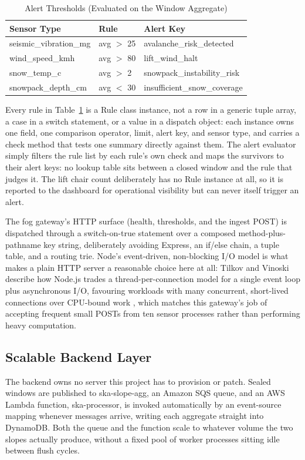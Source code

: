 \documentclass[conference]{IEEEtran}
\begin{document}
\begin{table}[!t]
\caption{Alert Thresholds (Evaluated on the Window Aggregate)}
\label{tab:thresholds}
\centering
\scriptsize
\setlength{\tabcolsep}{3pt}
\begin{tabular}{|l|l|l|}
\hline
\textbf{Sensor Type} & \textbf{Rule} & \textbf{Alert Key} \\
\hline
seismic\_vibration\_mg & avg $>$ 25 & avalanche\_risk\_detected \\
\hline
wind\_speed\_kmh & avg $>$ 80 & lift\_wind\_halt \\
\hline
snow\_temp\_c & avg $>$ 2 & snowpack\_instability\_risk \\
\hline
snowpack\_depth\_cm & avg $<$ 30 & insufficient\_snow\_coverage \\
\hline
\end{tabular}
\end{table}

Every rule in Table~\ref{tab:thresholds} is a Rule class instance, not a row in a generic tuple array, a case in a switch statement, or a value in a dispatch object: each instance owns one field, one comparison operator, limit, alert key, and sensor type, and carries a check method that tests one summary directly against them. The alert evaluator simply filters the rule list by each rule's own check and maps the survivors to their alert keys: no lookup table sits between a closed window and the rule that judges it. The lift chair count deliberately has no Rule instance at all, so it is reported to the dashboard for operational visibility but can never itself trigger an alert.

The fog gateway's HTTP surface (health, thresholds, and the ingest POST) is dispatched through a switch-on-true statement over a composed method-plus-pathname key string, deliberately avoiding Express, an if/else chain, a tuple table, and a routing trie. Node's event-driven, non-blocking I/O model is what makes a plain HTTP server a reasonable choice here at all: Tilkov and Vinoski describe how Node.js trades a thread-per-connection model for a single event loop plus asynchronous I/O, favouring workloads with many concurrent, short-lived connections over CPU-bound work \cite{ref4}, which matches this gateway's job of accepting frequent small POSTs from ten sensor processes rather than performing heavy computation.

\subsection{Scalable Backend Layer}
The backend owns no server this project has to provision or patch. Sealed windows are published to ska-slope-agg, an Amazon SQS queue, and an AWS Lambda function, ska-processor, is invoked automatically by an event-source mapping whenever messages arrive, writing each aggregate straight into DynamoDB. Both the queue and the function scale to whatever volume the two slopes actually produce, without a fixed pool of worker processes sitting idle between flush cycles.
\end{document}
